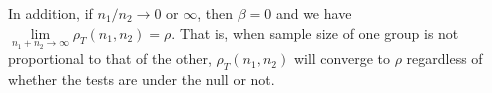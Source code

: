 In addition, if $n_1/n_2 \rightarrow 0$ or $\infty$, then $\beta = 0$ and we have $\lim\limits_{n_1 
+ n_2 \rightarrow \infty} \rho_T(n_1, n_2) = 
\rho$. That is, when sample size of one group is not proportional to that of the other, 
$\rho_T(n_1, n_2)$ will converge to $\rho$ regardless of whether the tests are under the null or 
not. 	



